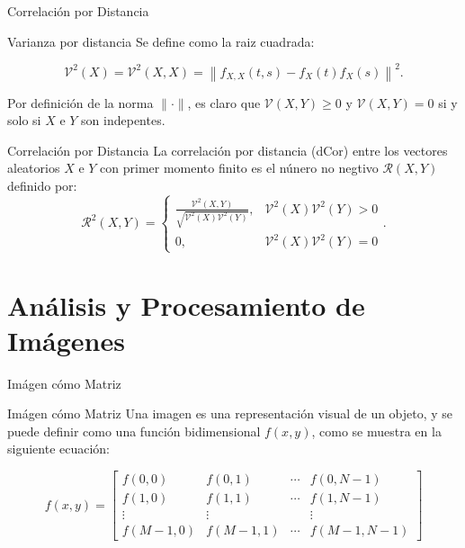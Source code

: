 \documentclass{beamer}
\begin{document}
\begin{frame}{Correlaci\'on por Distancia}
    \begin{block}{Varianza por distancia}
        Se define como la raiz cuadrada:

        $$
        \mathcal{V}^2(X)=\mathcal{V}^2(X, X)=\left\|f_{X, X}(t, s)-f_X(t) f_X(s)\right\|^2 .
        $$
    
        Por definici\'on de la norma $\|\cdot\|$, es claro que  $\mathcal{V}(X, Y) \geq 0$ y $\mathcal{V}(X, Y)=0$ si y solo si $X$ e $Y$ son indepentes.
        
    \end{block}
    \begin{block}{Correlaci\'on por Distancia}
        La correlaci\'on por distancia (dCor) entre los vectores aleatorios $X$ e $Y$ con primer momento finito es el n\'unero no negtivo $\mathcal{R}(X, Y)$ definido por:
		$$
		\mathcal{R}^2(X, Y)= \begin{cases}\frac{\mathcal{V}^2(X, Y)}{\sqrt{\mathcal{V}^2(X) \mathcal{V}^2(Y)}}, & \mathcal{V}^2(X) \mathcal{V}^2(Y)>0 \\ 0, & \mathcal{V}^2(X) \mathcal{V}^2(Y)=0\end{cases}.
		$$
    \end{block}
\end{frame}


\section{Análisis y Procesamiento de Imágenes}
\begin{frame}{Imágen cómo Matriz}
     
    \begin{block}{Imágen cómo Matriz}
        Una imagen es una representaci\'on visual de un objeto, y se puede definir como una funci\'on bidimensional $f(x,y)$, como se muestra en la siguiente ecuaci\'on:

        $$
        f(x, y)=\left[\begin{array}{cccc}
        f(0,0) & f(0,1) & \cdots & f(0, N-1) \\
        f(1,0) & f(1,1) & \cdots & f(1, N-1) \\
        \vdots & \vdots & & \vdots \\
        f(M-1,0) & f(M-1,1) & \cdots & f(M-1, N-1)
        \end{array}\right]
        $$
    \end{block}
\end{frame}
\end{document}
